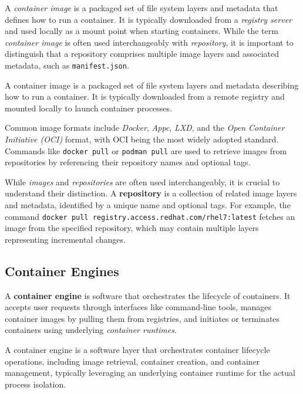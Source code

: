 A \textit{container image} is a packaged set of file system layers and metadata that defines how to run a container. It is typically downloaded from a \textit{registry server} and used locally as a mount point when starting containers. While the term \textit{container image} is often used interchangeably with \textit{repository}, it is important to distinguish that a repository comprises multiple image layers and associated metadata, such as \texttt{manifest.json}.

\begin{definitionblock}
A container image is a packaged set of file system layers and metadata describing how to run a container. It is typically downloaded from a remote registry and mounted locally to launch container processes.
\end{definitionblock}

Common image formats include \textit{Docker}, \textit{Appc}, \textit{LXD}, and the \textit{Open Container Initiative (OCI)} format, with OCI being the most widely adopted standard. Commands like \texttt{docker pull} or \texttt{podman pull} are used to retrieve images from repositories by referencing their repository names and optional tags.

\begin{observationblock}
While \textit{images} and \textit{repositories} are often used interchangeably, it is crucial to understand their distinction. A \textbf{repository} is a collection of related image layers and metadata, identified by a unique name and optional tags. For example, the command \texttt{docker pull registry.access.redhat.com/rhel7:latest} fetches an image from the specified repository, which may contain multiple layers representing incremental changes.
\end{observationblock}

\subsection{Container Engines}

A \textbf{container engine} is software that orchestrates the lifecycle of containers. It accepts user requests through interfaces like command-line tools, manages container images by pulling them from registries, and initiates or terminates containers using underlying \textit{container runtimes}.

\begin{definitionblock}
A container engine is a software layer that orchestrates container lifecycle operations, including image retrieval, container creation, and container management, typically leveraging an underlying container runtime for the actual process isolation.
\end{definitionblock}

